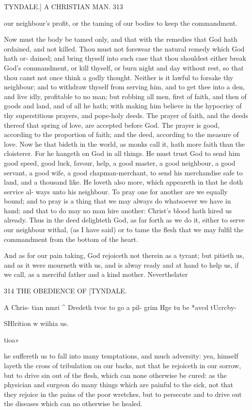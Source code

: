 \documentclass{custom}
\begin{document}
{TYNDALE.] A CHRISTIAN MAN. 313

our neighbour's profit, or the taming of our bodies to keep 
the commandment. 

Now must the body be tamed only, and that with the 
remedies that God hath ordained, and not killed. Thou 
must not forswear the natural remedy which God hath or- 
dained; and bring thyself into such case that thou shouldest 
either break God's commandment, or kill thyself, or 
burn night and day without rest, so that thou canst not 
once think a godly thought. Neither is it lawful to forsake 
thy neighbour; and to withdraw thyself from serving him, 
and to get thee into a den, and live idly, profitable to no 
man; but robbing all men, first of faith, and then of goods 
and land, and of all he hath; with making him believe in 
the hypocrisy of thy superstitious prayers, and pope-holy 
deeds. The prayer of faith, and the deeds thereof that
spring of love, are accepted before God. The prayer is
good, according to the proportion of faith; and the deed,
according to the measure of love. Now he that bideth
in the world, as monks call it, hath more faith than the
cloisterer. For he hangeth on God in all things. He
must trust God to send him good speed, good luck,
favour, help, a good master, a good neighbour, a good 
servant, a good wife, a good chapman-merchant, to send 
his merchandise safe to land, and a thousand like. He 
loveth also more, which appeareth in that he doth service al- 
ways unto his neighbour. To pray one for another are we 
equally bound; and to pray is a thing that we may always 
do whatsoever we have in hand; and that to do may no man 
hire another: Christ's blood hath hired us already. Thus 
in the deed delighteth God, as far forth as we do it, either 
to serve our neighbour withal, (as I have said) or to tame 
the flesh that we may fulfil the commandment from the 
bottom of the heart. 

And as for our pain taking, God rejoiceth not therein 
as a tyrant; but pitieth us, and as it were mourneth with 
us, and is alway ready and at hand to help us, if we call, 
as a merciful father and a kind mother. Neverthelater 


314
THE OBEDIENCE OF
[TYNDALE.

A Chris- 
tian nmri ^ 
Dredeth tvoc 
to go a pil- 
grim Hge tu 
be *avcd 
tUcrcby- 

SHlrition 
w wiihia us. 

tioa» 

he suffereth us to fall into many temptations, and much 
adversity: yea, himself layeth the cross of tribulation on 
our backs, not that he rejoiceth in our sorrow, but to 
drive sin out of the flesh, which can none otherwise be 
cured: as the physician and surgeon do many things which 
are painful to the sick, not that they rejoice in the pains 
of the poor wretches, but to persecute and to drive out 
the diseases which can no otherwise be healed. 

}
\end{document}
